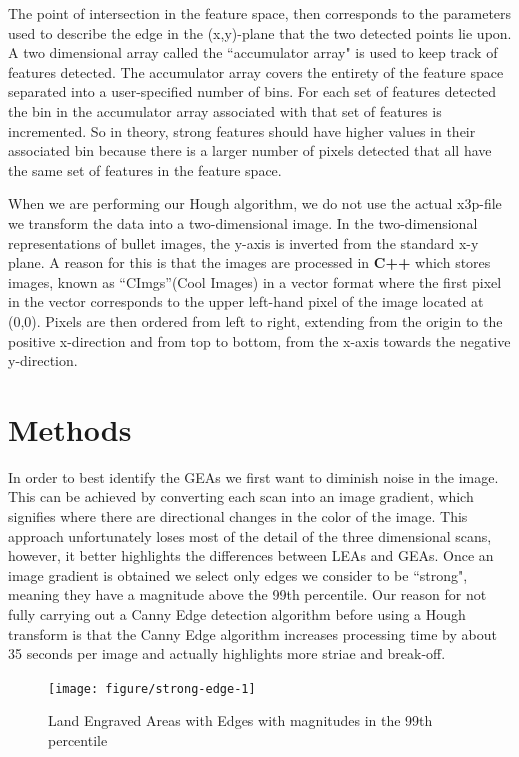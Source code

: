 \documentclass[12pt]{article}\usepackage[]{graphicx}\usepackage[]{color}
\newenvironment{knitrout}{}{} %
\theoremstyle{nonumberplain}
\begin{document}
The point of intersection in the feature space, then corresponds to the parameters used to describe the edge in the (x,y)-plane that the two detected points lie upon. A two dimensional array called the ``accumulator array" is used to keep track of features detected.  The accumulator array covers the entirety of the feature space separated into a user-specified number of bins. For each set of features detected the bin in the accumulator array associated with that set of features is incremented. So in theory, strong features should have higher values in their associated bin because there is a larger number of pixels detected that all have the same set of features in the feature space. 

 When we are performing our Hough algorithm, we do not use the actual x3p-file we transform the data into a two-dimensional image. In the two-dimensional representations of bullet images, the y-axis is inverted from the standard x-y plane. A reason for this is that the images are processed in \textbf{C++} which stores images, known as ``CImgs''(Cool Images) in a vector format where the first pixel in the vector corresponds to the upper left-hand pixel of the image located at (0,0). Pixels are then ordered from left to right, extending from the origin to the positive x-direction and from top to bottom, from the x-axis towards the negative y-direction.
 
\section{Methods}


In order to best identify the GEAs we first want to diminish noise in the image. This can be achieved by converting each scan into an image gradient, which signifies where there are directional changes in the color of the image. This approach unfortunately loses most of the detail of the three dimensional scans, however, it better highlights the differences between LEAs and GEAs. Once an image gradient is obtained we select only edges we consider to be ``strong", meaning they have a magnitude above the 99th percentile. Our reason for not fully carrying out a Canny Edge detection algorithm before using a Hough transform is that the Canny Edge algorithm increases processing time by about 35 seconds per image and actually highlights more striae and break-off. 

\begin{knitrout}
\color{fgcolor}\begin{figure}[H]

{\centering \texttt{[image: figure/strong-edge-1]} 

}

\caption[Land Engraved Areas with Edges with magnitudes in the 99th percentile]{Land Engraved Areas with Edges with magnitudes in the 99th percentile}\label{fig:strong-edge}
\end{figure}


\end{knitrout}
\end{document}
